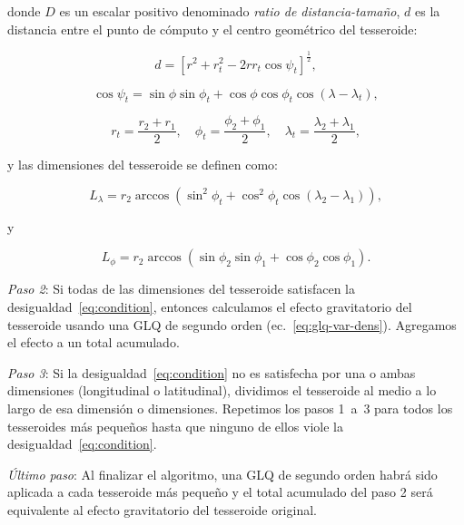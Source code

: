 \noindent
donde $D$ es un escalar positivo denominado \emph{ratio de distancia-tamaño},
$d$ es la distancia entre el punto de cómputo y el centro geométrico del
tesseroide:

\begin{equation}
    d = \left[
        r^2 + r_t^2 - 2 r r_t \cos\psi_t
        \right]^{\frac{1}{2}} ,
    \label{eq:distance}
\end{equation}

\begin{equation}
    \cos\psi_t =
        \sin\phi\sin\phi_t + \cos\phi\cos\phi_t\cos(\lambda - \lambda_t),
\end{equation}

\begin{equation}
    r_t = \frac{r_2 + r_1}{2}, \quad
    \phi_t = \frac{\phi_2 + \phi_1}{2}, \quad
    \lambda_t = \frac{\lambda_2 + \lambda_1}{2},
\end{equation}

\noindent
y las dimensiones del tesseroide se definen como:

\begin{equation}
    L_\lambda = r_2 \arccos(\sin^2\phi_t +
        \cos^2\phi_t\cos(\lambda_2 - \lambda_1)),
    \label{eq:sizelon}
\end{equation}

\noindent y

\begin{equation}
    L_\phi = r_2 \arccos(\sin\phi_2\sin\phi_1 + \cos\phi_2\cos\phi_1).
\end{equation}

\textit{Paso 2}:
Si todas de las dimensiones del tesseroide satisfacen la
desigualdad~\ref{eq:condition}, entonces calculamos el efecto gravitatorio del
tesseroide usando una \ac{GLQ} de segundo orden (ec.~\ref{eq:glq-var-dens}).
Agregamos el efecto a un total acumulado.

\textit{Paso 3}:
Si la desigualdad~\ref{eq:condition} no es satisfecha por una o ambas
dimensiones (longitudinal o latitudinal), dividimos el tesseroide al medio a lo
largo de esa dimensión o dimensiones.
Repetimos los pasos 1~a~3 para todos los tesseroides más pequeños hasta que
ninguno de ellos viole la desigualdad~\ref{eq:condition}.

\textit{Último paso}:
Al finalizar el algoritmo, una \ac{GLQ} de segundo orden habrá sido aplicada
a cada tesseroide más pequeño y el total acumulado del paso 2 será equivalente
al efecto gravitatorio del tesseroide original.

